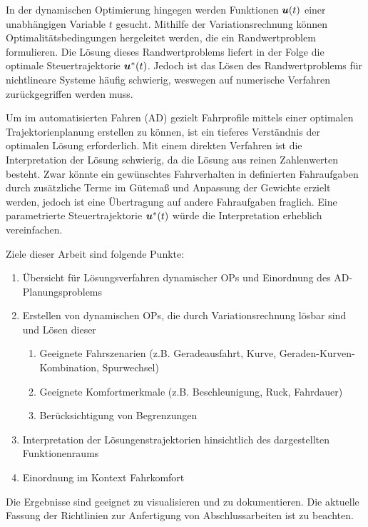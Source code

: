 In der dynamischen Optimierung hingegen werden Funktionen $\boldsymbol{u}(t)$ einer unabhängigen Variable $t$ gesucht. 
Mithilfe der Variationsrechnung können Optimalitätsbedingungen hergeleitet werden, die ein Randwertproblem formulieren. 
Die Lösung dieses Randwertproblems liefert in der Folge die optimale Steuertrajektorie ${\boldsymbol{u}}^*(t)$. 
Jedoch ist das Lösen des Randwertproblems für nichtlineare Systeme häufig schwierig, weswegen auf numerische Verfahren zurückgegriffen werden muss.

Um im automatisierten Fahren (AD) gezielt Fahrprofile mittels einer optimalen Trajektorienplanung erstellen zu können, ist ein tieferes Verständnis der optimalen Lösung erforderlich. 
Mit einem direkten Verfahren ist die Interpretation der Lösung schwierig, da die Lösung aus reinen Zahlenwerten besteht. 
Zwar könnte ein gewünschtes Fahrverhalten in definierten Fahraufgaben durch zusätzliche Terme im Gütemaß und Anpassung der Gewichte erzielt werden, jedoch ist eine Übertragung auf andere Fahraufgaben fraglich. 
Eine parametrierte Steuertrajektorie ${\boldsymbol{u}}^*(t)$ würde die Interpretation erheblich vereinfachen.


Ziele dieser Arbeit sind folgende Punkte:
\begin{enumerate}
	\item Übersicht für Lösungsverfahren dynamischer OPs und Einordnung des AD-Planungsproblems
	\item Erstellen von dynamischen OPs, die durch Variationsrechnung lösbar sind und Lösen dieser
	\begin{enumerate}
		\item Geeignete Fahrszenarien (z.B. Geradeausfahrt, Kurve, Geraden-Kurven-Kombination, Spurwechsel)
		\item Geeignete Komfortmerkmale (z.B. Beschleunigung, Ruck, Fahrdauer)
		\item Berücksichtigung von Begrenzungen
	\end{enumerate}
	\item Interpretation der Lösungenstrajektorien hinsichtlich des dargestellten Funktionenraums 
	\item Einordnung im Kontext Fahrkomfort
\end{enumerate}

Die Ergebnisse sind geeignet zu visualisieren und zu dokumentieren. Die aktuelle Fassung der Richtlinien zur Anfertigung von Abschlussarbeiten ist zu beachten.


%
%
%
